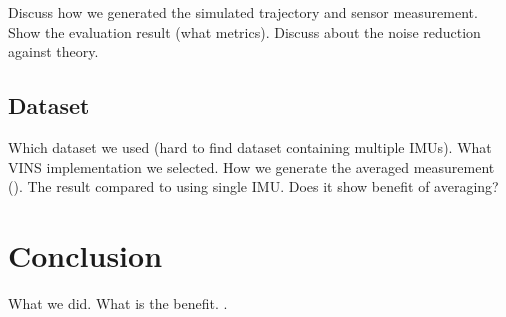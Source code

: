 \documentclass[conference]{IEEEtran}
\begin{document}
Discuss how we generated the simulated trajectory and sensor measurement. Show the evaluation result (what metrics). Discuss about the noise reduction against theory.

\subsection{Dataset}

Which dataset we used (hard to find dataset containing multiple IMUs). What VINS implementation we selected. How we generate the averaged measurement (). The result compared to using single IMU. Does it show benefit of averaging?

\section{Conclusion}

What we did. What is the benefit. \cite{Farahan2022}.



\end{document}
